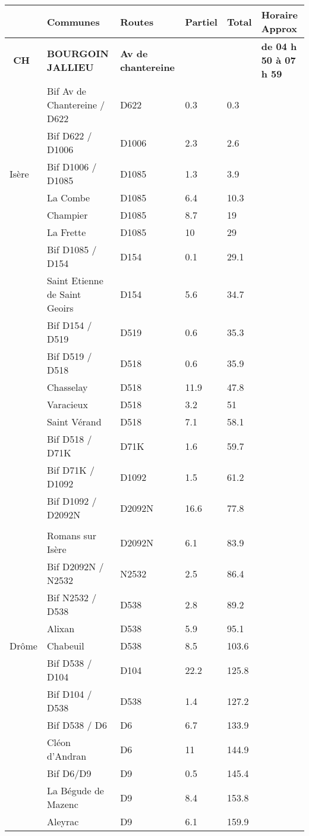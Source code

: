 \documentclass{article}%
\begin{document}
\begin{longtable}{p{2.25cm}|p{7.0cm}|p{1.5cm}|p{1.5cm}|p{1.5cm}|p{3.5cm}}%
\hline%
&Communes&Routes&Partiel&Total&Horaire Approx\\%
\hline%
\endhead%
\endfoot%
\endlastfoot%
\textbf{﻿                               CH }&\textbf{BOURGOIN  JALLIEU}&\textbf{Av de chantereine}& & &\textbf{de 04 h 50 à 07 h 59}\\%
 &Bif Av de Chantereine / D622&D622&0.3&0.3& \\%
 &Bif D622 / D1006&D1006&2.3&2.6& \\%
Isère&Bif D1006 / D1085&D1085&1.3&3.9& \\%
 &La Combe&D1085&6.4&10.3& \\%
 &Champier&D1085&8.7&19& \\%
 &La Frette&D1085&10&29& \\%
 &Bif D1085 / D154&D154&0.1&29.1& \\%
 &Saint Etienne de Saint Geoirs&D154&5.6&34.7& \\%
 &Bif D154 / D519&D519&0.6&35.3& \\%
 &Bif D519 / D518&D518&0.6&35.9& \\%
 &Chasselay&D518&11.9&47.8& \\%
 &Varacieux&D518&3.2&51& \\%
 &Saint Vérand&D518&7.1&58.1& \\%
 &Bif D518 / D71K&D71K&1.6&59.7& \\%
 &Bif D71K / D1092&D1092&1.5&61.2& \\%
 &Bif D1092 / D2092N&D2092N&16.6&77.8& \\%
\hline& & & & & \\%
 &Romans sur Isère&D2092N&6.1&83.9& \\%
 &Bif D2092N / N2532&N2532&2.5&86.4& \\%
 &Bif N2532 / D538&D538&2.8&89.2& \\%
 &Alixan&D538&5.9&95.1& \\%
Drôme&Chabeuil&D538&8.5&103.6& \\%
 &Bif D538 / D104&D104&22.2&125.8& \\%
 &Bif D104 / D538&D538&1.4&127.2& \\%
 &Bif D538 / D6&D6&6.7&133.9& \\%
 &Cléon d'Andran&D6&11&144.9& \\%
 &Bif D6/D9&D9&0.5&145.4& \\%
 &La Bégude de Mazenc&D9&8.4&153.8& \\%
 &Aleyrac&D9&6.1&159.9& \\%

\end{longtable}
\end{document}

